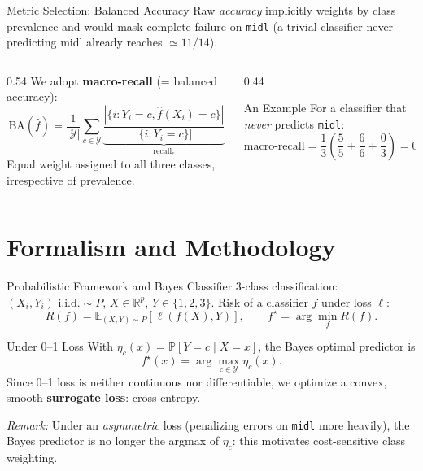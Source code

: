 \documentclass[aspectratio=169, 10pt]{beamer}
\begin{document}
\begin{frame}{Metric Selection: Balanced Accuracy}
  Raw \textit{accuracy} implicitly weights by class prevalence and would mask complete failure on \texttt{midl} (a trivial classifier never predicting midl already reaches $\simeq 11/14$).

  \medskip
  \begin{columns}[c]
    \begin{column}{0.54\textwidth}
      We adopt \textbf{macro-recall} (= balanced accuracy):
      \[
        \text{BA}(\hat{f}) = \frac{1}{|\mathcal{Y}|} \sum_{c \in \mathcal{Y}} \underbrace{\frac{|\{i : Y_i = c, \hat{f}(X_i) = c\}|}{|\{i : Y_i = c\}|}}_{\text{recall}_c}
      \]
      Equal weight assigned to all three classes, irrespective of prevalence.
    \end{column}

    \begin{column}{0.44\textwidth}
      \begin{alertblock}{An Example}
        For a classifier that \textit{never} predicts \texttt{midl}:
        \[
          \text{macro-recall} = \frac{1}{3}\left(\frac{5}{5} + \frac{6}{6} + \frac{0}{3}\right) = 0.667
        \]
      \end{alertblock}
    \end{column}
  \end{columns}
\end{frame}

\section{Formalism and Methodology}

\begin{frame}{Probabilistic Framework and Bayes Classifier}
  \vspace{7pt}
  3-class classification: $(X_i, Y_i) \text{ i.i.d.} \sim P$, $X \in \mathbb{R}^p$, $Y \in \{1, 2, 3\}$. Risk of a classifier $f$ under loss $\ell$:
  \[
    R(f) = \mathbb{E}_{(X,Y)\sim P}[\ell(f(X), Y)], \qquad f^\star = \arg\min_f R(f).
  \]

  \bigskip
  \begin{block}{Under 0--1 Loss}
    With $\eta_c(x) = \mathbb{P}[Y = c \mid X = x]$, the Bayes optimal predictor is
    \[
      f^\star(x) = \arg\max_{c \in \mathcal{Y}} \eta_c(x).
    \]
    Since 0--1 loss is neither continuous nor differentiable, we optimize a convex, smooth \textbf{surrogate loss}: cross-entropy.
  \end{block}

  \bigskip
  \textit{Remark:} Under an \textit{asymmetric} loss (penalizing errors on \texttt{midl} more heavily), the Bayes predictor is no longer the argmax of $\eta_c$: this motivates cost-sensitive class weighting.
\end{frame}
\end{document}
